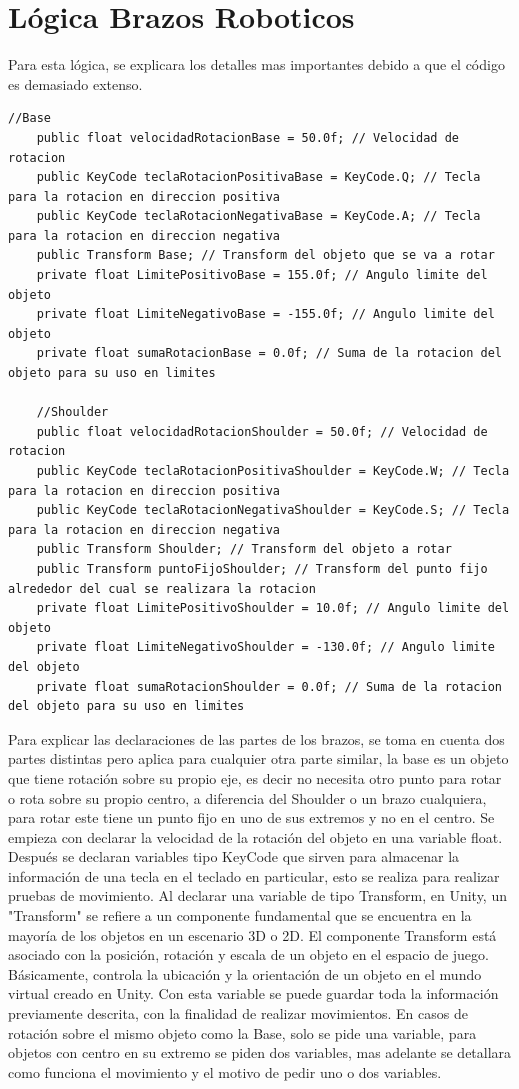 \section{Lógica Brazos Roboticos}
Para esta lógica, se explicara los detalles mas importantes debido a que el código es demasiado extenso.
\begin{lstlisting}[frame=single]
   //Base
    public float velocidadRotacionBase = 50.0f; // Velocidad de rotacion
    public KeyCode teclaRotacionPositivaBase = KeyCode.Q; // Tecla para la rotacion en direccion positiva
    public KeyCode teclaRotacionNegativaBase = KeyCode.A; // Tecla para la rotacion en direccion negativa
    public Transform Base; // Transform del objeto que se va a rotar
    private float LimitePositivoBase = 155.0f; // Angulo limite del objeto
    private float LimiteNegativoBase = -155.0f; // Angulo limite del objeto
    private float sumaRotacionBase = 0.0f; // Suma de la rotacion del objeto para su uso en limites

    //Shoulder
    public float velocidadRotacionShoulder = 50.0f; // Velocidad de rotacion
    public KeyCode teclaRotacionPositivaShoulder = KeyCode.W; // Tecla para la rotacion en direccion positiva
    public KeyCode teclaRotacionNegativaShoulder = KeyCode.S; // Tecla para la rotacion en direccion negativa
    public Transform Shoulder; // Transform del objeto a rotar
    public Transform puntoFijoShoulder; // Transform del punto fijo alrededor del cual se realizara la rotacion
    private float LimitePositivoShoulder = 10.0f; // Angulo limite del objeto
    private float LimiteNegativoShoulder = -130.0f; // Angulo limite del objeto
    private float sumaRotacionShoulder = 0.0f; // Suma de la rotacion del objeto para su uso en limites
\end{lstlisting}
Para explicar las declaraciones de las partes de los brazos, se toma en cuenta dos partes distintas pero aplica para cualquier otra parte similar, la base es un objeto que tiene rotación sobre su propio eje, es decir no necesita otro punto para rotar o rota sobre su propio centro, a diferencia del Shoulder o un brazo cualquiera, para rotar este tiene un punto fijo en uno de sus extremos y no en el centro.
Se empieza con declarar la velocidad de la rotación del objeto en una variable float. Después se declaran variables tipo KeyCode que sirven para almacenar la información de una tecla en el teclado en particular, esto se realiza para realizar pruebas de movimiento.
Al declarar una variable de tipo Transform, en Unity, un "Transform" se refiere a un componente fundamental que se encuentra en la mayoría de los objetos en un escenario 3D o 2D. El componente Transform está asociado con la posición, rotación y escala de un objeto en el espacio de juego. Básicamente, controla la ubicación y la orientación de un objeto en el mundo virtual creado en Unity. Con esta variable se puede guardar toda la información previamente descrita, con la finalidad de realizar movimientos. En casos de rotación sobre el mismo objeto como la Base, solo se pide una variable, para objetos con centro en su extremo se piden dos variables, mas adelante se detallara como funciona el movimiento y el motivo de pedir uno o dos variables.
